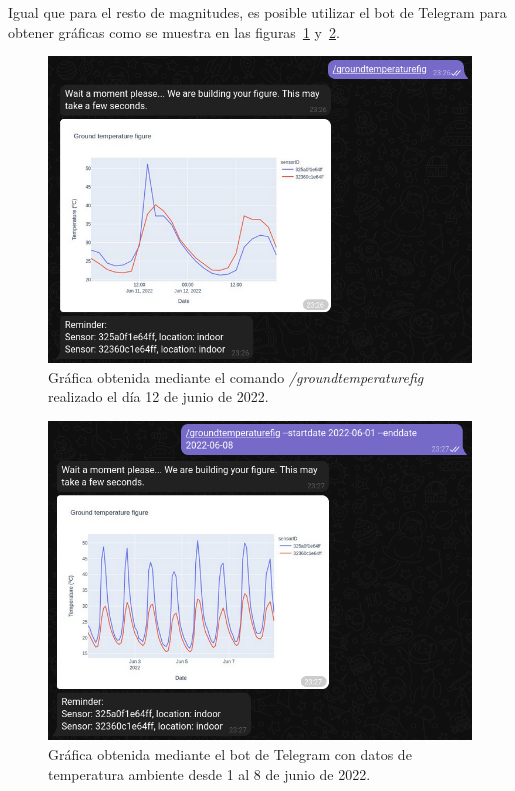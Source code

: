 \documentclass[a4paper, 12pt, oneside]{book}
\begin{document}
Igual que para el resto de magnitudes, es posible utilizar el bot de Telegram para obtener gráficas como se muestra en las figuras~\ref{figura:groundtemperaturefig_telegram} y~\ref{figura:groundtemperaturefig_telegram_options}.

\begin{figure}[H]
	\centering
    \includegraphics[width=12cm, keepaspectratio]{img/groundtemperaturefig_telegram}
    \caption{Gráfica obtenida mediante el comando \textit{/groundtemperaturefig} realizado el día 12 de junio de 2022.}
    \label{figura:groundtemperaturefig_telegram}
\end{figure}

\begin{figure}[H]
	\centering
    \includegraphics[width=12cm, keepaspectratio]{img/groundtemperaturefig_telegram_options}
    \caption{Gráfica obtenida mediante el bot de Telegram con datos de temperatura ambiente desde 1 al 8 de junio de 2022.}
    \label{figura:groundtemperaturefig_telegram_options}
\end{figure}
\end{document}
